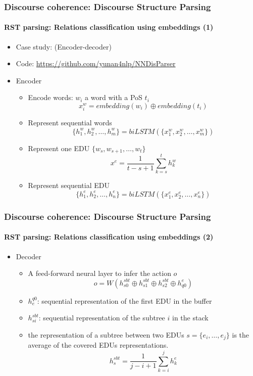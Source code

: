 \documentclass[xcolor=table]{beamer}
\begin{document}
\begin{frame}
	\frametitle{Discourse coherence: Discourse Structure Parsing}
	\framesubtitle{RST parsing: Relations classification using embeddings (1)}
	
	\begin{itemize}
		\item Case study: \cite{2018-yu-al} (Encoder-decoder)
		\item Code: \url{https://github.com/yunan4nlp/NNDisParser}
		\item Encoder 
		\begin{itemize}
			\item Encode words: $ w_i $ a word with a PoS $t_i$
			\[x_i^w = embedding(w_i) \oplus embedding(t_i)\]
			\item Represent sequential words
			\[ \{h_1^w, h_2^w, \ldots, h_m^w \} = biLSTM(\{x_1^w, x_2^w, \ldots, x_m^w \})\]
			\item Represent one EDU $\{w_s, w_{s+1}, \ldots, w_t \}$
			\[ x^e = \frac{1}{t-s+1} \sum_{k=s}^{t} h_k^w\]
			\item Represent sequential EDU
			\[ \{h_1^e, h_2^e, \ldots, h_n^e \} = biLSTM(\{x_1^e, x_2^e, \ldots, x_n^e \})\]
		\end{itemize}
	\end{itemize}
	
\end{frame}

\begin{frame}
	\frametitle{Discourse coherence: Discourse Structure Parsing}
	\framesubtitle{RST parsing: Relations classification using embeddings (2)}
	
	\begin{itemize}
		\item Decoder 
		\begin{itemize}
			\item A feed-forward neural layer to infer the action $o$
			\[o = W(h_{s0}^{sbt} \oplus h_{s1}^{sbt} \oplus h_{s2}^{sbt} \oplus h_{q0}^{e})\]
			\item $ h_{e}^{q0} $: sequential representation of the first EDU in the buffer
			\item $h_{si}^{sbt}$: sequential representation of the subtree $i$ in the stack
			\item the representation of a subtree between two EDUs $ s= \{e_i, \ldots, e_j\}$ is the average of the covered EDUs representations. 
			\[ h_{s}^{sbt} = \frac{1}{j-i+1} \sum_{k=i}^{j} h_k^e\]
		\end{itemize}
	\end{itemize}
	
\end{frame}
\end{document}
